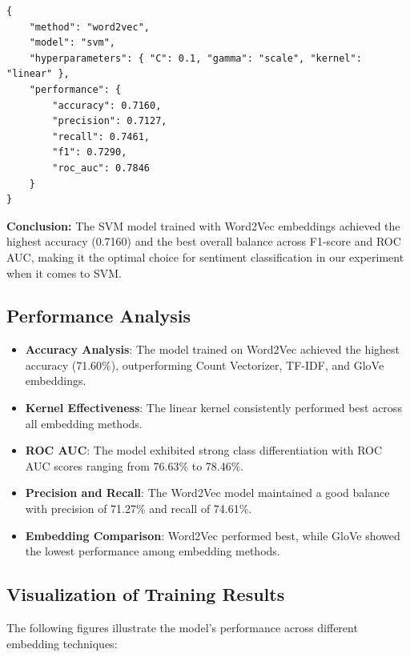 \begin{verbatim}
{
    "method": "word2vec",
    "model": "svm",
    "hyperparameters": { "C": 0.1, "gamma": "scale", "kernel": "linear" },
    "performance": {
        "accuracy": 0.7160,
        "precision": 0.7127,
        "recall": 0.7461,
        "f1": 0.7290,
        "roc_auc": 0.7846
    }
}
\end{verbatim}

\textbf{Conclusion:} The SVM model trained with Word2Vec embeddings achieved the highest accuracy (0.7160) and the best overall balance across F1-score and ROC AUC, making it the optimal choice for sentiment classification in our experiment when it comes to SVM.

\subsection{Performance Analysis}
\begin{itemize}
    \item \textbf{Accuracy Analysis}: The model trained on Word2Vec achieved the highest accuracy (71.60\%), outperforming Count Vectorizer, TF-IDF, and GloVe embeddings.
    \item \textbf{Kernel Effectiveness}: The linear kernel consistently performed best across all embedding methods.
    \item \textbf{ROC AUC}: The model exhibited strong class differentiation with ROC AUC scores ranging from 76.63\% to 78.46\%.
    \item \textbf{Precision and Recall}: The Word2Vec model maintained a good balance with precision of 71.27\% and recall of 74.61\%.
    \item \textbf{Embedding Comparison}: Word2Vec performed best, while GloVe showed the lowest performance among embedding methods.
\end{itemize}

\subsection{Visualization of Training Results}
The following figures illustrate the model's performance across different embedding techniques:

